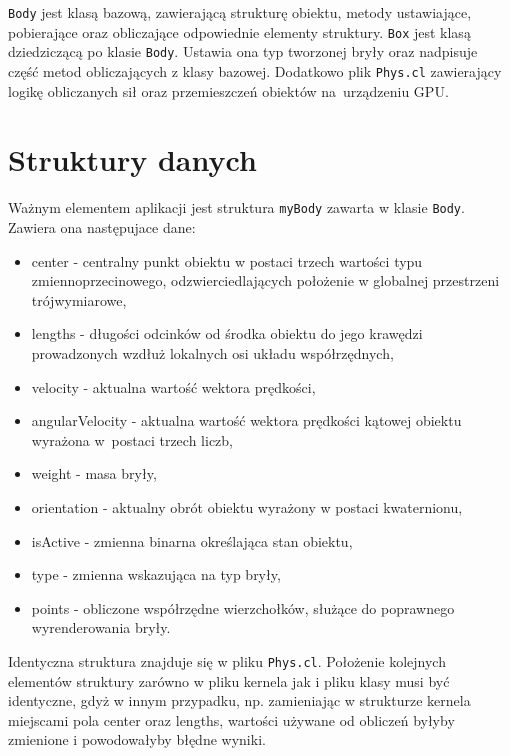 \verb$Body$ jest klasą bazową, zawierającą strukturę obiektu, metody ustawiające, pobierające oraz obliczające odpowiednie elementy struktury.
\verb$Box$ jest klasą dziedziczącą po klasie \verb$Body$. Ustawia ona typ tworzonej bryły oraz nadpisuje część metod obliczających z klasy bazowej.
Dodatkowo plik \verb$Phys.cl$ zawierający logikę obliczanych sił oraz przemieszczeń obiektów na~urządzeniu GPU.

\section{Struktury danych}
Ważnym elementem aplikacji jest struktura \verb$myBody$ zawarta w klasie \verb$Body$. Zawiera ona następujace dane:
\begin{itemize}
\item center -  centralny punkt obiektu w postaci trzech wartości typu zmiennoprzecinowego, odzwierciedlających położenie w globalnej przestrzeni trójwymiarowe,
\item lengths - długości odcinków od środka obiektu do jego krawędzi prowadzonych wzdłuż lokalnych osi układu współrzędnych,
\item velocity - aktualna wartość wektora prędkości,
\item angularVelocity - aktualna wartość wektora prędkości kątowej obiektu wyrażona w~postaci trzech liczb,
\item weight - masa bryły,
\item orientation - aktualny obrót obiektu wyrażony w postaci kwaternionu,
\item isActive - zmienna binarna określająca stan obiektu,
\item type - zmienna wskazująca na typ bryły,
\item points - obliczone współrzędne wierzchołków, służące do poprawnego wyrenderowania bryły.
\end{itemize}
Identyczna struktura znajduje się w pliku \verb$Phys.cl$. Położenie kolejnych elementów struktury zarówno w pliku kernela jak i pliku klasy musi być identyczne, gdyż w innym przypadku, np. zamieniając w strukturze kernela miejscami pola center oraz lengths, wartości używane od obliczeń byłyby zmienione i powodowałyby błędne wyniki.


